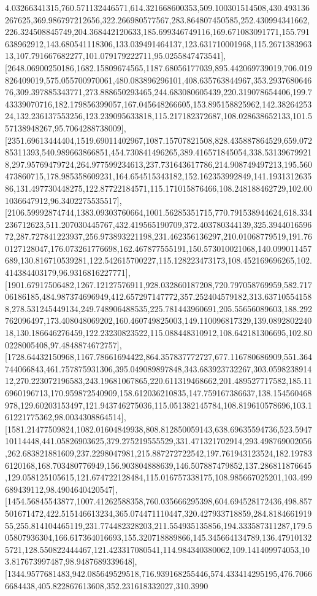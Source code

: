\documentclass{article}
\begin{document}
4.03266341315,760.571132446571,614.321668600353,509.100301514508,430.493136267625,369.986797212656,322.266980577567,283.864807450585,252.430994341662,226.324508845749,204.368442120633,185.699346749116,169.671083091771,155.791638962912,143.680541118306,133.039491464137,123.631710001968,115.267138396313,107.791667682277,101.079179222711,95.0255847473541],[2648.06900250186,1682.15809674565,1187.68056177039,895.442069739019,706.019826409019,575.055700970061,480.083896296101,408.635763844967,353.293768064676,309.397885343771,273.888650293465,244.683080605439,220.319078654406,199.743339070716,182.179856399057,167.045648266605,153.895158825962,142.3826425324,132.236137553256,123.239095633818,115.217182372687,108.028638652133,101.557138948267,95.7064288738009],[2351.69613444404,1519.69011402967,1087.15707821508,828.435887864529,659.07285311393,540.989663866851,454.730841496265,389.416571845054,338.531396799218,297.95769479724,264.977599234613,237.731643617786,214.908749497213,195.560473860715,178.985358609231,164.654515343182,152.162353992849,141.193131263586,131.497730448275,122.87722184571,115.171015876466,108.248188462729,102.001036647912,96.3402275535517],[2106.59992874744,1383.09303760664,1001.56285351715,770.791538944624,618.334236712623,511.207030445767,432.419565190709,372.403780344139,325.394401659672,287.727841223937,256.973893221198,231.462356136297,210.01068779519,191.760127128047,176.073261776698,162.467877555191,150.573010021068,140.099011457689,130.816710539281,122.542615700227,115.128223473173,108.452169696265,102.414384403179,96.9316816227771],[1901.67917506482,1267.12127576911,928.032860187208,720.797058769959,582.71706186185,484.987374696949,412.657297147772,357.252404579182,313.637105541588,278.531245449134,249.748906488535,225.781443960691,205.55656089603,188.292762096497,173.408048069202,160.460749825003,149.110096817329,139.089280224018,130.186646276459,122.23230823522,115.088448310912,108.642181306695,102.800228005408,97.4848874672757],[1728.64432150968,1167.78661694422,864.357837772727,677.116780686909,551.364744066843,461.757875931306,395.049089897848,343.683923732267,303.059823891412,270.223072196583,243.19681067865,220.611319468662,201.489527717582,185.116960196713,170.959872540909,158.612036210835,147.759167386637,138.154560468978,129.60203153497,121.943746275036,115.051382145784,108.819610578696,103.161221775362,98.0034308864514],[1581.21477509824,1082.01604849938,808.812850059143,638.69635594736,523.594710114448,441.05826903625,379.275219555529,331.471321702914,293.498769002056,262.683821881609,237.2298047981,215.887272722542,197.761943123524,182.197836120168,168.703480776949,156.903804888639,146.507887479852,137.286811876645,129.058125105615,121.674722128484,115.016757338175,108.985667025201,103.499689439112,98.4904640420547],[1454.56845543877,1007.41262588358,760.035666295398,604.694528172436,498.857501671472,422.515146613234,365.074471110447,320.427933718859,284.818466191955,255.814104465119,231.774482328203,211.554935135856,194.333587311287,179.505807936304,166.617364016693,155.320718889866,145.345664134789,136.479101325721,128.550822444467,121.423317080541,114.984340380062,109.141409974053,103.817673997487,98.9487689339648],[1344.9577681483,942.085649529518,716.939168255446,574.433414295195,476.70666684438,405.822867613608,352.231618332027,310.3990
\end{document}
